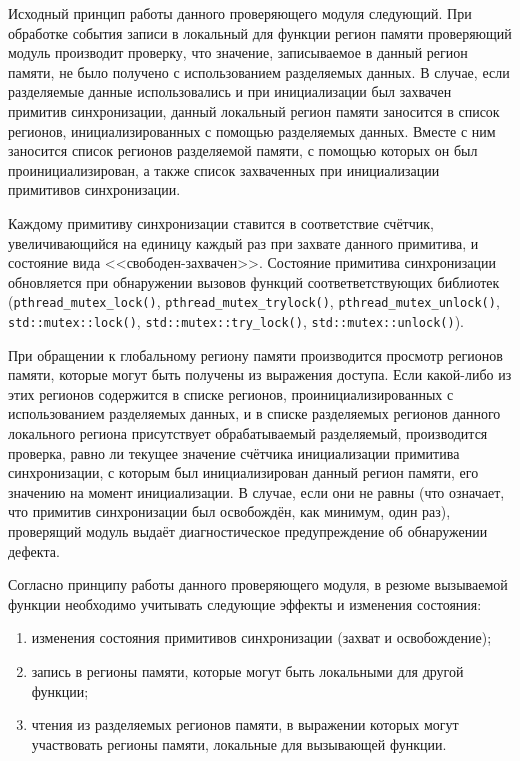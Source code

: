Исходный принцип работы данного проверяющего модуля следующий. При обработке события записи в локальный для функции регион памяти проверяющий модуль производит проверку, что значение, записываемое в данный регион памяти, не было получено с использованием разделяемых данных. В случае, если разделяемые данные использовались и при инициализации был захвачен примитив синхронизации, данный локальный регион памяти заносится в список регионов, инициализированных с помощью разделяемых данных. Вместе с ним заносится список регионов разделяемой памяти, с помощью которых он был проинициализирован, а также список захваченных при инициализации примитивов синхронизации.

Каждому примитиву синхронизации ставится в соответствие счётчик, увеличивающийся на единицу каждый раз при захвате данного примитива, и состояние вида <<свободен-захвачен>>. Состояние примитива синхронизации обновляется при обнаружении вызовов функций соответветствующих библиотек (\texttt{pthread\_mutex\_lock()}, \texttt{pthread\_mutex\_trylock()}, \texttt{pthread\_mutex\_unlock()}, \texttt{std::mutex::lock()}, \texttt{std::mutex::try\_lock()}, \texttt{std::mutex::unlock()}).

При обращении к глобальному региону памяти производится просмотр регионов памяти, которые могут быть получены из выражения доступа. Если какой-либо из этих регионов содержится в списке регионов, проинициализированных с использованием разделяемых данных, и в списке разделяемых регионов данного локального региона присутствует обрабатываемый разделяемый, производится проверка, равно ли текущее значение счётчика инициализации примитива синхронизации, с которым был инициализирован данный регион памяти, его значению на момент инициализации. В случае, если они не равны (что означает, что примитив синхронизации был освобождён, как минимум, один раз), проверящий модуль выдаёт диагностическое предупреждение об обнаружении дефекта.

Согласно принципу работы данного проверяющего модуля, в резюме вызываемой функции необходимо учитывать следующие эффекты и изменения состояния:

\begin{enumerate}
 \item изменения состояния примитивов синхронизации (захват и освобождение);
 \item запись в регионы памяти, которые могут быть локальными для другой функции;
 \item чтения из разделяемых регионов памяти, в выражении которых могут участвовать регионы памяти, локальные для вызывающей функции.
\end{enumerate}

